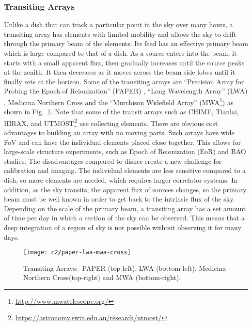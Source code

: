 %
\subsubsection{Transiting Arrays}	   \label{chap2:sec4.3.2}
%
Unlike a dish that can track a particular point in the sky over many hours, a transiting array has elements with limited mobility and allows the sky
to drift through the primary beam of the elements. Its feed has an effective primary beam which is large compared to that of a dish.
As a source enters into the beam, it starts with a small apparent flux, then gradually increases until the source peaks at the zenith. It then decreases as it moves 
across the beam side lobes until it finally sets at the horizon. Some of the  transiting arrays are \enquote{Precision Array for Probing the Epoch of Reionization} (PAPER)
\citep{parsons2010precision},  \enquote{Long Wavelength Array} (LWA) \citep{ellingson2013design}, Medicina Northern Cross and 
the \enquote{Murchison Widefield Array} (MWA\footnote{\url{ http://www.mwatelescope.org/}}) \citep{2009IEEEP..97.1497L} as shown in Fig.~\ref{fig:paper}. Note that
some of the transit arrays such as CHIME, Tianlai, HIRAX, and UTMOST\footnote{\url{https://astronomy.swin.edu.au/research/utmost/}} use collecting elements.
There are obvious cost advantages to building an array with no moving parts. Such arrays have wide FoV and can have the individual elements
placed close together. This allows for large-scale structure experiments, such as Epoch of Reionization (EoR) and BAO studies. 
The disadvantages compared to dishes create a new challenge for calibration and imaging. The individual elements are less sensitive compared to a dish, so more
elements are needed, which requires larger correlator systems. In addition, as the sky transits, the apparent flux of sources changes, so the primary beam must be well known in order 
to get back to the intrinsic flux of the sky. Depending on the scale of the primary beam, a transiting array has a set amount of time per day in which a
section of the sky can be observed. This means that a deep integration of a region of sky is not possible without observing it for many days.
%
%
%
\begin{figure}[ht]
\centering	    
\texttt{[image: c2/paper-lwa-mwa-cross]}
\caption{Transiting Arrays:- PAPER (top-left), LWA (bottom-left),  Medicina Northern Cross(top-right) and MWA (bottom-right).}
\label{fig:paper}
\end{figure}
  \FloatBarrier 
  
